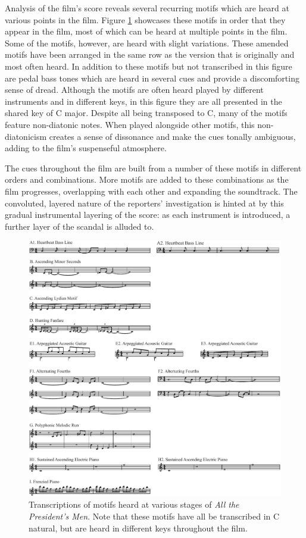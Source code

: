 Analysis of the film's score reveals several recurring motifs which are heard at various points in the film.
Figure \ref{fig:president-all-motifs} showcases these motifs in order that they appear in the film, most of which can be heard at multiple points in the film.
Some of the motifs, however, are heard with slight variations.
These amended motifs have been arranged in the same row as the version that is originally and most often heard.
In addition to these motifs but not transcribed in this figure are pedal bass tones which are heard in several cues and provide a discomforting sense of dread.
Although the motifs are often heard played by different instruments and in different keys, in this figure they are all presented in the shared key of C major.
Despite all being transposed to C, many of the motifs feature non-diatonic notes.
When played alongside other motifs, this non-diatonicism creates a sense of dissonance and make the cues tonally ambiguous, adding to the film’s suspenseful atmosphere.

The cues throughout the film are built from a number of these motifs in different orders and combinations. 
More motifs are added to these combinations as the film progresses, overlapping with each other and expanding the soundtrack.
The convoluted, layered nature of the reporters' investigation is hinted at by this gradual instrumental layering of the score: as each instrument is introduced, a further layer of the scandal is alluded to.
\begin{figure}
    \centering
    \includegraphics[width=1\linewidth]{img/president-all-motifs.pdf}
    \caption{Transcriptions of motifs heard at various stages of \textit{All the President's Men}. Note that these motifs have all be transcribed in C natural, but are heard in different keys throughout the film.}
    \label{fig:president-all-motifs}
\end{figure}



